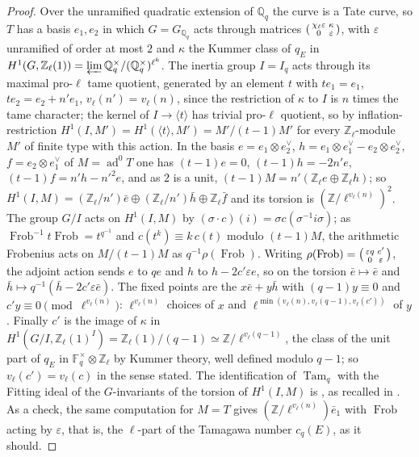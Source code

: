 \documentclass[11pt]{amsart}
\theoremstyle{definition}
\newcommand{\Q}{\mathbb{Q}}
\newcommand{\Z}{\mathbb{Z}}
\newcommand{\F}{\mathbb{F}}
\newcommand{\ad}{\operatorname{ad}^0}
\newcommand{\Frob}{\operatorname{Frob}}
\newcommand{\Tam}{\operatorname{Tam}}
\begin{document}
\begin{proof}
Over the unramified quadratic extension of $\Q_q$ the curve is a Tate curve, so $T$ has a basis $e_1,e_2$ in which $G=G_{\Q_q}$ acts through matrices $\begin{psmallmatrix}\chi_\ell\varepsilon&\kappa\\0&\varepsilon\end{psmallmatrix}$, with $\varepsilon$ unramified of order at most $2$ and $\kappa$ the Kummer class of $q_E$ in $H^1(G,\Z_\ell(1))=\varprojlim\Q_q^\times/(\Q_q^\times)^{\ell^k}$. The inertia group $I=I_q$ acts through its maximal pro-$\ell$ tame quotient, generated by an element $t$ with $te_1=e_1$, $te_2=e_2+n'e_1$, $v_\ell(n')=v_\ell(n)$, since the restriction of $\kappa$ to $I$ is $n$ times the tame character; the kernel of $I\to\langle t\rangle$ has trivial pro-$\ell$ quotient, so by inflation-restriction $H^1(I,M')=H^1(\langle t\rangle,M')=M'/(t-1)M'$ for every $\Z_\ell$-module $M'$ of finite type with this action. In the basis $e=e_1\otimes e_2^\vee$, $h=e_1\otimes e_1^\vee-e_2\otimes e_2^\vee$, $f=e_2\otimes e_1^\vee$ of $M=\ad T$ one has $(t-1)e=0$, $(t-1)h=-2n'e$, $(t-1)f=n'h-n'^2e$, and as $2$ is a unit, $(t-1)M=n'(\Z_\ell e\oplus\Z_\ell h)$; so $H^1(I,M)=(\Z_\ell/n')\bar e\oplus(\Z_\ell/n')\bar h\oplus\Z_\ell\bar f$ and its torsion is $(\Z/\ell^{v_\ell(n)})^2$. The group $G/I$ acts on $H^1(I,M)$ by $(\sigma\cdot c)(i)=\sigma c(\sigma^{-1}i\sigma)$; as $\Frob^{-1}t\Frob=t^{q^{-1}}$ and $c(t^k)\equiv k\,c(t)$ modulo $(t-1)M$, the arithmetic Frobenius acts on $M/(t-1)M$ as $q^{-1}\rho(\Frob)$. Writing $\rho(\Frob)=\begin{psmallmatrix}\varepsilon q&c'\\0&\varepsilon\end{psmallmatrix}$, the adjoint action sends $e$ to $qe$ and $h$ to $h-2c'\varepsilon e$, so on the torsion $\bar e\mapsto\bar e$ and $\bar h\mapsto q^{-1}(\bar h-2c'\varepsilon\bar e)$. The fixed points are the $x\bar e+y\bar h$ with $(q-1)y\equiv0$ and $c'y\equiv0\pmod{\ell^{v_\ell(n)}}$: $\ell^{v_\ell(n)}$ choices of $x$ and $\ell^{\min(v_\ell(n),v_\ell(q-1),v_\ell(c'))}$ of $y$. Finally $c'$ is the image of $\kappa$ in $H^1(G/I,\Z_\ell(1)^I)=\Z_\ell(1)/(q-1)\simeq\Z/\ell^{v_\ell(q-1)}$, the class of the unit part of $q_E$ in $\F_q^\times\otimes\Z_\ell$ by Kummer theory, well defined modulo $q-1$; so $v_\ell(c')=v_\ell(c)$ in the sense stated. The identification of $\Tam_q$ with the Fitting ideal of the $G$-invariants of the torsion of $H^1(I,M)$ is \cite[I.4.2.2]{FPR94}, as recalled in \cite[p.~708]{DFG04}. As a check, the same computation for $M=T$ gives $(\Z/\ell^{v_\ell(n)})\bar e_1$ with $\Frob$ acting by $\varepsilon$, that is, the $\ell$-part of the Tamagawa number $c_q(E)$, as it should.
\end{proof}
\end{document}
